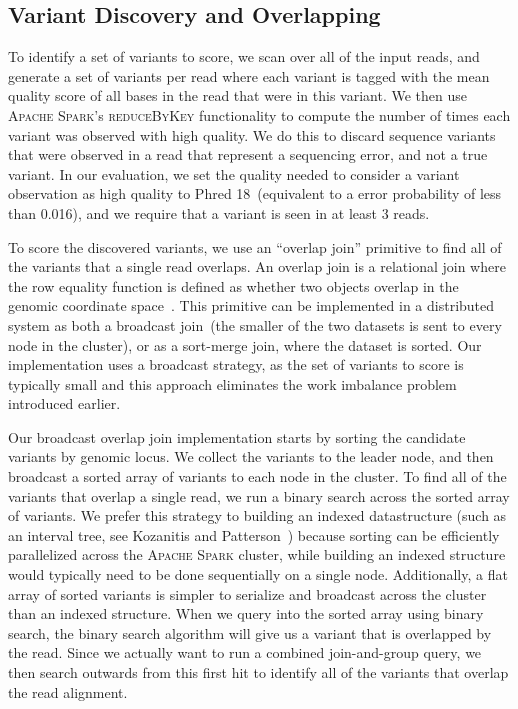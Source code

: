 \documentclass[phd]{ucbthesis}
\begin{document}
\subsection{Variant Discovery and Overlapping}
\label{sec:discovery}

To identify a set of variants to score, we scan over all of the input reads,
and generate a set of variants per read where each variant is tagged with the
mean quality score of all bases in the read that were in this variant. We then
use \textsc{Apache Spark}'s \textsc{reduceByKey} functionality to compute
the number of times each variant was observed with high quality. We do this
to discard sequence variants that were observed in a read that represent a
sequencing error, and not a true variant. In our evaluation, we set the quality
needed to consider a variant observation as high quality to Phred 18~(equivalent
to a error probability of less than 0.016), and we require that a variant is
seen in at least 3 reads.

To score the discovered variants, we use an ``overlap join'' primitive to
find all of the variants that a single read overlaps. An overlap join is a
relational join where the row equality function is defined as whether two
objects overlap in the genomic coordinate space~\cite{nothaft15}. This
primitive can be implemented in a distributed system as both a broadcast
join~(the smaller of the two datasets is sent to every node in the cluster),
or as a sort-merge join, where the dataset is sorted. Our implementation
uses a broadcast strategy, as the set of variants to score is typically small
and this approach eliminates the work imbalance problem introduced earlier.

Our broadcast overlap join implementation starts by sorting the candidate
variants by genomic locus. We collect the variants to the leader node, and
then broadcast a sorted array of variants to each node in the cluster. To
find all of the variants that overlap a single read, we run a binary search
across the sorted array of variants. We prefer this strategy to building
an indexed datastructure (such as an interval tree, see Kozanitis and Patterson~\cite{kozanitis16})
because sorting can be efficiently parallelized across the \textsc{Apache
Spark} cluster, while building an indexed structure would typically need to be
done sequentially on a single node. Additionally, a flat array of sorted
variants is simpler to serialize and broadcast across the cluster than an
indexed structure. When we query into the sorted array using binary search,
the binary search algorithm will give us a variant that is overlapped by
the read. Since we actually want to run a combined join-and-group query,
we then search outwards from this first hit to identify all of the variants
that overlap the read alignment.
\end{document}
